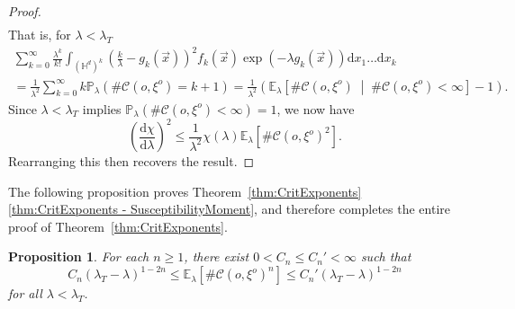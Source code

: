 \documentclass[10pt,a4paper,dvipsnames]{article}
\newtheorem{prop}[theorem]{Proposition}
\theoremstyle{definition}
\theoremstyle{remark}
\newcommand{\pla}{\mathbb P_\lambda}
\newcommand{\ela}{\mathbb E_{\lambda}}
\newcommand{\HypDim}{{\mathbb{H}^d}}
\newcommand{\dd}{\mathrm{d}} %
\newcommand{\C}{\mathscr {C}}
\newcommand{\orig}{o}
\numberwithin{equation}{section}
\begin{document}
\begin{proof}
\begin{align}
    \end{align}
    That is, for $\lambda<\lambda_T$
    \begin{multline}
        \sum^\infty_{k=0}\frac{\lambda^k}{k!} \int_{\left(\HypDim\right)^k}\left(\frac{k}{\lambda}-g_k\left(\vec{x}\right)\right)^2f_k\left(\vec{x}\right)\exp\left(-\lambda g_k\left(\vec{x}\right)\right)\dd x_1\ldots \dd x_{k}\\
        = \frac{1}{\lambda^2}\sum^\infty_{k=0}k\pla\left(\#\C\left(\orig,\xi^{\orig}\right) = k+1\right) = \frac{1}{\lambda^2}\left(\ela\left[\#\C\left(\orig,\xi^{\orig}\right) \;\middle|\;\#\C\left(\orig,\xi^{\orig}\right)<\infty\right] -1\right).
    \end{multline}
    Since $\lambda<\lambda_T$ implies $\pla\left(\#\C\left(\orig,\xi^{\orig}\right)<\infty\right) =1$, we now have
    \begin{equation}
        \left(\frac{\dd \chi}{\dd \lambda}\right)^2 \leq \frac{1}{\lambda^2}\chi\left(\lambda\right)\ela\left[\#\C\left(\orig,\xi^{\orig}\right)^2\right].
    \end{equation}
    Rearranging this then recovers the result.
\end{proof}

The following proposition proves Theorem~\ref{thm:CritExponents}\ref{thm:CritExponents - SusceptibilityMoment}, and therefore completes the entire proof of Theorem~\ref{thm:CritExponents}.
\begin{prop}
\label{prop:ClusterMomentExponent}
    For each $n\geq 1$, there exist $0<C_n\leq C_n'<\infty$ such that
    \begin{equation}
        C_n\left(\lambda_T-\lambda\right)^{1-2n} \leq \ela\left[\#\C\left(\orig,\xi^{\orig}\right)^n\right] \leq C_n'\left(\lambda_T-\lambda\right)^{1-2n}
    \end{equation}
    for all $\lambda<\lambda_T$.
\end{prop}
\end{document}
